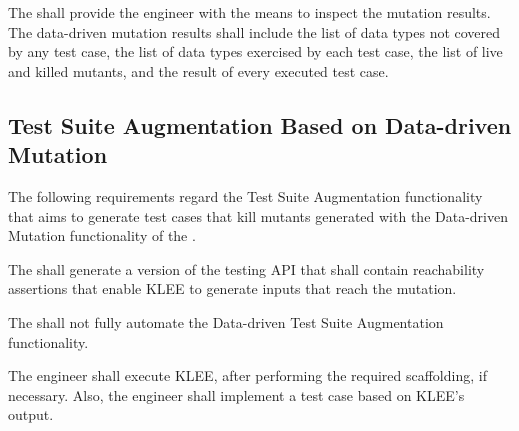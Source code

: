 









\RQ{} The \FAQAS shall provide the engineer with the means to inspect the mutation results. The \FAQAS data-driven mutation results shall include the list of data types not covered by any test case, the list of data types exercised by each test case, the list of live and killed mutants, and the result of every executed test case.


\subsection{Test Suite Augmentation Based on Data-driven Mutation}
\label{sec:codeDrivenAugmentation}

The following requirements regard the Test Suite Augmentation functionality that aims to generate test cases that kill mutants generated with the Data-driven Mutation functionality of the \FAQAS.

\RQ{} The \FAQAS shall generate a version of the testing API that shall contain reachability assertions that enable KLEE to generate inputs that reach the mutation.

\RQ{} The \FAQAS shall not fully automate the Data-driven Test Suite Augmentation functionality.

\remark The engineer shall execute KLEE, after performing the required scaffolding, if necessary.
Also, the engineer shall implement a test case based on KLEE's output.
